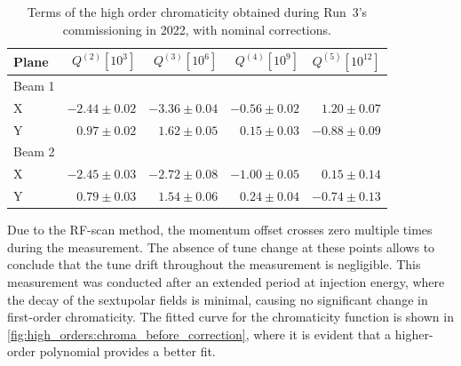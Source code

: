 \begin{table}[!htb]
    \centering
    \begin{tabular}{lrrrr}
    \toprule
         Plane & $Q^{(2)} [10^3]$ & $Q^{(3)} [10^6]$ & $Q^{(4)} [10^9]$ & $Q^{(5)} [10^{12}]$ \\
    \midrule
        Beam 1 &              &               &              & \\
        \hspace{2mm}X         & $-2.44 \pm 0.02$ & $-3.36 \pm 0.04$ & $-0.56 \pm 0.02 $ & $ 1.20 \pm 0.07$ \\
        \hspace{2mm}Y         & $ 0.97 \pm 0.02$ & $ 1.62 \pm 0.05$ &$  0.15 \pm 0.03$ & $-0.88 \pm 0.09$ \\
        Beam 2 &              &                &                & \\
        \hspace{2mm}X         & $-2.45 \pm 0.03$ & $-2.72 \pm 0.08$ & $-1.00 \pm 0.05 $ & $ 0.15 \pm 0.14$ \\
        \hspace{2mm}Y         & $ 0.79 \pm 0.03$ & $1.54 \pm 0.06 $ & $ 0.24 \pm 0.04 $ & $-0.74 \pm 0.13$ \\
    \bottomrule
    \end{tabular}
    \caption{Terms of the high order chromaticity obtained during Run~3's commissioning in 2022,
    with nominal corrections.}
    \label{tab:high_orders:chroma_fidel}
  \end{table}

Due to the RF-scan method, the momentum offset crosses zero multiple times during the measurement.
The absence of tune change at these points allows to conclude that the tune drift throughout
the measurement is negligible. This measurement was conducted after an extended period at
injection energy, where the decay of the sextupolar fields is minimal, causing no significant change
in first-order chromaticity. The fitted curve for the chromaticity function is shown in
\cref{fig:high_orders:chroma_before_correction}, where it is evident that a higher-order polynomial
provides a better fit.

